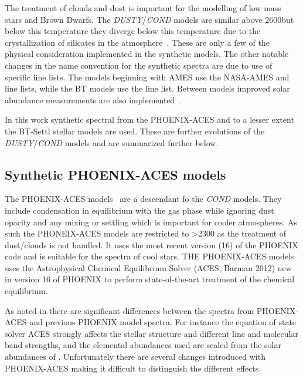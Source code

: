 The treatment of clouds and dust is important for the modelling of low mass stars and Brown Dwarfs.
The \emph{DUSTY}/\emph{COND} models are similar above 2600\K but below this temperature they diverge below this temperature due to the crystallization of silicates in the atmosphere~\citep{allard_limiting_2001}.
These are only a few of the physical consideration implemented in the synthetic models.
The other notable changes in the name convention for the synthetic spectra are due to use of specific line lists.
The models beginning with AMES use the NASA-AMES  and  line lists, while the {BT} models use the \citet{barber_highaccuracy_2006}  line list.
Between models improved solar abundance measurements are also implemented~\citep[][]{asplund_chemical_2009}.

In this work synthetic spectral from the {PHOENIX-ACES} and to a lesser extent the {BT-Settl} stellar models are used.
These are further evolutions of the \emph{DUSTY}/\emph{COND} models and are summarized further below.


\subsection{Synthetic {PHOENIX-ACES} models}
\label{subsec:phoenix_aces}

The {PHOENIX-ACES} models~\citep{husser_new_2013} are a descendant fo the \emph{COND} models.
They include condensation in equilibrium with the gas phase while ignoring dust opacity and any mixing or settling which is important for cooler atmospheres.
As such the {PHONEIX-ACES} models are restricted to \Teff{} >2300\K{} as the treatment of dust/clouds is not handled.
It uses the most recent version (16) of the {PHOENIX} code and is suitable for the spectra of cool stars.
THE PHOENIX-ACES models uses the Astrophysical Chemical Equilibrium Solver (ACES, Barman 2012) new in version 16 of PHOENIX to perform state-of-the-art treatment of the chemical equilibrium.

As noted in \citep{husser_new_2013} there are significant differences between the spectra from PHOENIX-ACES and previous PHOENIX model spectra.
For instance the equation of state solver ACES strongly affects the stellar structure and different line and molecular band strengths, and the elemental abundances used are scaled from the solar abundances of \citet{asplund_checmial_2009}.
Unfortunately there are several changes introduced with {PHOENIX-ACES} making it difficult to distinguish the different effects.


